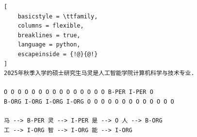 \documentclass{article}
\begin{document}
\begin{lstlisting}[
    basicstyle = \ttfamily,
    columns = flexible,
    breaklines = true,
    language = python,
    escapeinside = {!@}{@!}
]
2025年秋季入学的硕士研究生马灵是人工智能学院计算机科学与技术专业.

O O O O O O O O O O O O O O O B-PER I-PER O
B-ORG I-ORG I-ORG I-ORG O O O O O O O O O O O O O

马 --> B-PER 灵 --> I-PER 是 --> O 人 --> B-ORG
工 --> I-ORG 智 --> I-ORG 能 --> I-ORG
\end{lstlisting}
\end{document}
